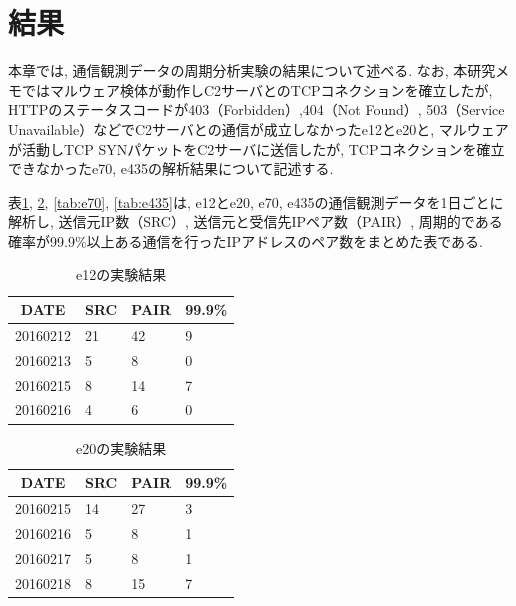 \documentclass[twocolumn,10pt]{ltjsarticle}
\begin{document}
\section{結果}
本章では, 通信観測データの周期分析実験の結果について述べる. なお, 本研究メモではマルウェア検体が動作しC2サーバとのTCPコネクションを確立したが, HTTPのステータスコードが403（Forbidden）,404（Not Found）, 503（Service Unavailable）などでC2サーバとの通信が成立しなかったe12とe20と, マルウェアが活動しTCP SYNパケットをC2サーバに送信したが, TCPコネクションを確立できなかったe70, e435の解析結果について記述する. 

表\ref{tab:e12}, \ref{tab:e20}, \ref{tab:e70}, \ref{tab:e435}は, e12とe20, e70, e435の通信観測データを1日ごとに解析し, 送信元IP数（SRC）, 送信元と受信先IPペア数（PAIR）, 周期的である確率が99.9\%以上ある通信を行ったIPアドレスのペア数をまとめた表である. 

\begin{table}[htbp]
    \centering
    \caption{e12の実験結果}

    \begin{tabular}{c||lll}
        \hline
        DATE & SRC & PAIR & 99.9\% \\
        \hline \hline
        20160212  & 21 & 42 & 9 \\
        20160213  & 5  & 8  & 0 \\
        20160215  & 8  & 14 & 7 \\
        20160216  & 4  & 6  & 0 \\
        \hline
    \end{tabular}

    \label{tab:e12}
\end{table}

\begin{table}[htbp]
    \centering
    \caption{e20の実験結果}

    \begin{tabular}{c||lll}
        \hline
        DATE & SRC & PAIR & 99.9\% \\
        \hline \hline
        20160215  & 14 & 27 & 3 \\
        20160216  & 5  & 8  & 1 \\
        20160217  & 5  & 8  & 1 \\
        20160218  & 8  & 15 & 7 \\
        \hline
    \end{tabular}

    \label{tab:e20}
\end{table}
\end{document}

